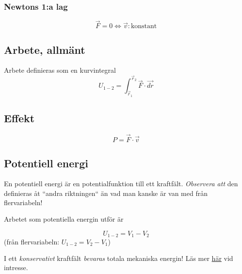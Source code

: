 \documentclass{article}
\newenvironment{ankiflashcard}[1]{}{}
\begin{document}
\begin{paracol}{2}
\begin{ankiflashcard}{Vad säger Newtons första lag?}
    
\subsubsection{Newtons 1:a lag}
$$\vec F = 0 \iff \vec v: \text{konstant}$$
\end{ankiflashcard}

\subsection{Arbete, allmänt}

\begin{ankiflashcard}{Definiera arbete (generella definitionen)}
Arbete definieras som en kurvintegral
$$
U_{1-2} = \int_{\vec r_1}^{\vec r_2} \vec F \cdot \vec{dr}
$$
\end{ankiflashcard}

\begin{ankiflashcard}{Definiera effekt.}
\subsection{Effekt}
$$P = \vec F \cdot \vec v$$
\end{ankiflashcard}

\begin{ankiflashcard}{Definiera potentiell energi}
\subsection{Potentiell energi}
En potentiell energi är en potentialfunktion till ett kraftfält. \textit{Observera att} den definieras åt ``andra riktningen`` än vad man kanske är van med från flervariabeln!

Arbetet som potentiella energin utför är

$$
U_{1-2} = V_1 - V_2
$$
(från flervariabeln: $U_{1-2}=V_2-V_1$)
\end{ankiflashcard}



\begin{ankiflashcard}{Hur förhåller sig totala mekaniska energin i ett konservativt kraftfält?}
I ett \textit{konservativt} kraftfält \textit{bevaras} totala mekaniska energin! Läs mer \href{https://physics-chalmers.github.io/ffm234/doc/pub/08-potentialteori/html/08-potentialteori-bs.html}{här} vid intresse.
\end{ankiflashcard}

\end{paracol}
\end{document}
